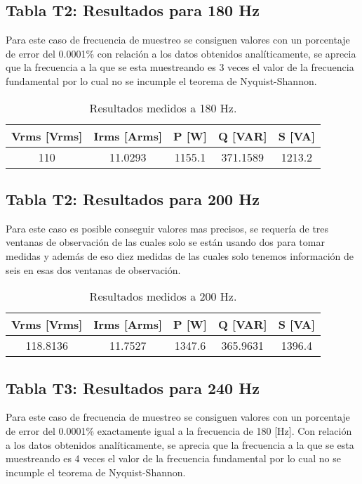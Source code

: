 
\subsection*{Tabla T2: Resultados para 180 Hz}
    Para este caso de frecuencia de muestreo se consiguen valores con un porcentaje de error del 0.0001\% con relación a los datos obtenidos analíticamente, se aprecia que la frecuencia a la que se esta muestreando es 3 veces el valor de la frecuencia fundamental por lo cual no se incumple el teorema de Nyquist-Shannon.
    \begin{table}[h!]
        \centering
        \begin{tabular}{@{}ccccc@{}}
            \toprule
            Vrms [Vrms] & Irms [Arms] & P [W] & Q [VAR] & S [VA] \\ \midrule
                110 & 11.0293 & 1155.1 & 371.1589 & 1213.2\\ 
                \bottomrule
        \end{tabular}
        \caption{Resultados medidos a 180 Hz.}
    \end{table}



    \subsection*{Tabla T2: Resultados para 200 Hz}
    Para este caso es posible conseguir valores mas precisos, se requería de tres ventanas de observación de las cuales solo se están usando dos para tomar medidas y además de eso diez medidas de las cuales solo tenemos información de seis en esas dos ventanas de observación.
    \begin{table}[h!]
        \centering
        \begin{tabular}{@{}ccccc@{}}
            \toprule
            Vrms [Vrms] & Irms [Arms] & P [W] & Q [VAR] & S [VA] \\ \midrule
            118.8136 & 11.7527 & 1347.6 & 365.9631 & 1396.4 \\ 
            \bottomrule
        \end{tabular}
        \caption{Resultados medidos a 200 Hz.}
    \end{table}

    \subsection*{Tabla T3: Resultados para 240 Hz}
    Para este caso de frecuencia de muestreo se consiguen valores con un porcentaje de error del 0.0001\% exactamente igual a la frecuencia de 180 [Hz]. Con relación a los datos obtenidos analíticamente, se aprecia que la frecuencia a la que se esta muestreando es 4 veces el valor de la frecuencia fundamental por lo cual no se incumple el teorema de Nyquist-Shannon. 

